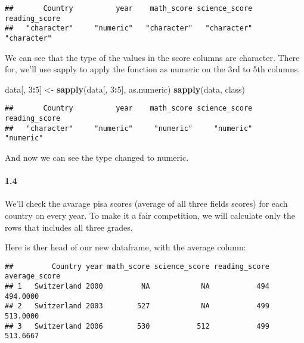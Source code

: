 \documentclass[]{article}
\newenvironment{Shaded}{\begin{snugshade}}{\end{snugshade}}
\newcommand{\KeywordTok}[1]{\textcolor[rgb]{0.13,0.29,0.53}{\textbf{#1}}}
\newcommand{\DataTypeTok}[1]{\textcolor[rgb]{0.13,0.29,0.53}{#1}}
\newcommand{\DecValTok}[1]{\textcolor[rgb]{0.00,0.00,0.81}{#1}}
\newcommand{\StringTok}[1]{\textcolor[rgb]{0.31,0.60,0.02}{#1}}
\newcommand{\OtherTok}[1]{\textcolor[rgb]{0.56,0.35,0.01}{#1}}
\newcommand{\OperatorTok}[1]{\textcolor[rgb]{0.81,0.36,0.00}{\textbf{#1}}}
\newcommand{\NormalTok}[1]{#1}
\let\oldparagraph\paragraph
\renewcommand{\paragraph}[1]{\oldparagraph{#1}\mbox{}}
\begin{document}
\begin{verbatim}
##       Country          year    math_score science_score reading_score 
##   "character"     "numeric"   "character"   "character"   "character"
\end{verbatim}

We can see that the type of the values in the score columns are
character. There for, we'll use sapply to apply the function as numeric
on the 3rd to 5th columns.

\begin{Shaded}
\begin{Highlighting}[]
\NormalTok{data[, }\DecValTok{3}\OperatorTok{:}\DecValTok{5}\NormalTok{] <-}\StringTok{ }\KeywordTok{sapply}\NormalTok{(data[, }\DecValTok{3}\OperatorTok{:}\DecValTok{5}\NormalTok{], as.numeric)}
\KeywordTok{sapply}\NormalTok{(data, class)}
\end{Highlighting}
\end{Shaded}

\begin{verbatim}
##       Country          year    math_score science_score reading_score 
##   "character"     "numeric"     "numeric"     "numeric"     "numeric"
\end{verbatim}

And now we can see the type changed to numeric.

\paragraph{1.4}\label{section-3}

We'll check the avarage pisa scores (average of all three fields scores)
for each country on every year. To make it a fair competition, we will
calculate only the rows that includes all three grades.

\begin{Shaded}
\end{Shaded}

Here is ther head of our new dataframe, with the average column:

\begin{verbatim}
##         Country year math_score science_score reading_score average_score
## 1   Switzerland 2000         NA            NA           494      494.0000
## 2   Switzerland 2003        527            NA           499      513.0000
## 3   Switzerland 2006        530           512           499      513.6667
\end{verbatim}
\end{document}
